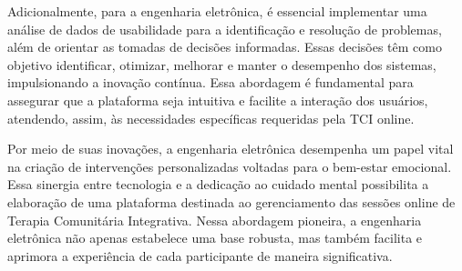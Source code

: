 Adicionalmente, para a engenharia eletrônica, é essencial implementar uma análise de dados de usabilidade para a identificação e resolução de problemas, além de orientar as tomadas de decisões informadas. Essas decisões têm como objetivo identificar, otimizar, melhorar e manter o desempenho dos sistemas, impulsionando a inovação contínua. Essa abordagem é fundamental para assegurar que a plataforma seja intuitiva e facilite a interação dos usuários, atendendo, assim, às necessidades específicas requeridas pela TCI online.

Por meio de suas inovações, a engenharia eletrônica desempenha um papel vital na criação de intervenções personalizadas voltadas para o bem-estar emocional. Essa sinergia entre tecnologia e a dedicação ao cuidado mental possibilita a elaboração de uma plataforma destinada ao gerenciamento das sessões online de Terapia Comunitária Integrativa. Nessa abordagem pioneira, a engenharia eletrônica não apenas estabelece uma base robusta, mas também facilita e aprimora a experiência de cada participante de maneira significativa.

